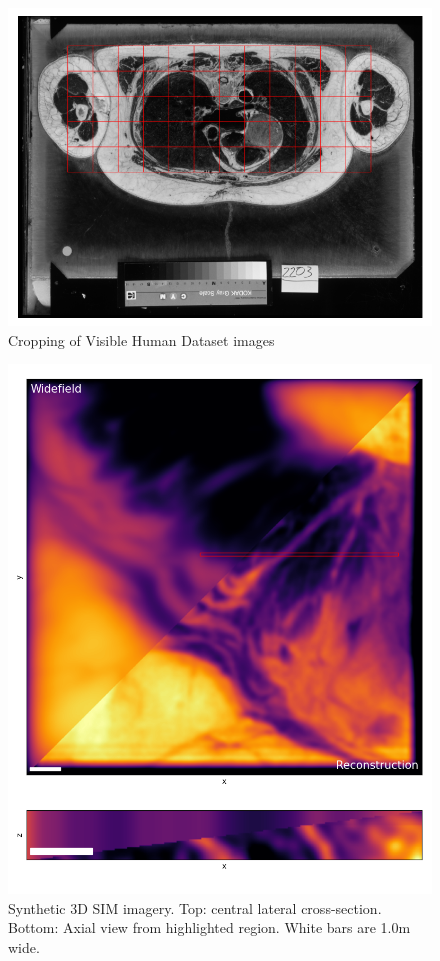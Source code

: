 \documentclass[12pt]{article}
\begin{document}
\begin{figure}[hbtp]
    \includegraphics[scale=0.65, center]{figures/visible_human_volumes_grey.png}
    \caption{Cropping of Visible Human Dataset images}
    \label{fig:vhcrop}
\end{figure}

\begin{figure}[hbtp]
    \includegraphics[scale=0.8, center]{figures/3DSIM_recon.png}
    \caption{Synthetic 3D SIM imagery. Top: central lateral cross-section. Bottom: Axial view from highlighted region. White bars are 1.0\textmu m wide.}
    \label{fig:3D_SIM}
\end{figure}
\end{document}
